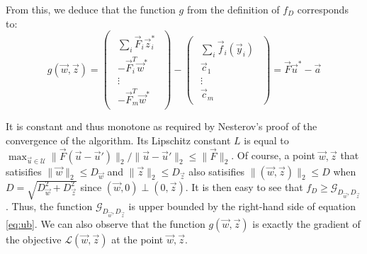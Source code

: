 From this, we deduce that the function $g$ from the definition of $f_D$ corresponds to:
\begin{equation}
  g(\vec w, \vec z) =
  \begin{pmatrix}
    \begin{array}{c}
      \sum_i \vec F_i \vec z_i^*\\
      - \vec F_i^T \vec w^*\\
      \vdots\\
      - \vec F_m^T \vec w^*
    \end{array}
  \end{pmatrix} -
  \begin{pmatrix}
    \begin{array}{c}
      \sum_i \vec f_i (\vec y_i)\\
      \vec c_1\\
      \vdots\\
      \vec c_m
    \end{array}
  \end{pmatrix} = \vec F \vec u^* - \vec a
\end{equation}


It is constant and thus monotone as required by Nesterov's proof of the
convergence of the algorithm. Its Lipschitz constant $L$ is equal to $\max_{\vec
u \in \mathcal{U}} \lVert \vec F (\vec u - \vec u') \rVert_2 / \lVert \vec u -
\vec u' \rVert_2 \leq \lVert \vec F \rVert_2$. Of course, a point $\vec w, \vec
z$ that satisifies $\lVert \vec w \rVert_2 \leq D_{\vec w}$ and $\lVert \vec z
\rVert_2 \leq D_{\vec z}$ also satisifies $\lVert (\vec w, \vec z) \rVert_2 \leq
D$ when $D = \sqrt{D_{\vec w}^2 + D_{\vec z}^2}$ since $(\vec w, 0) \perp (0,
\vec z)$. It is then easy to see that $f_D \geq \mathcal{G}_{D_{\vec w}, D_{\vec
z}}$. Thus, the function $\mathcal{G}_{D_{\vec w}, D_{\vec z}}$ is upper bounded
by the right-hand side of equation \ref{eq:ub}. We can also observe that the
function $g(\vec w, \vec z)$ is exactly the gradient of the objective
$\mathcal{L}(\vec w, \vec z)$ at the point $\vec w, \vec z$.

